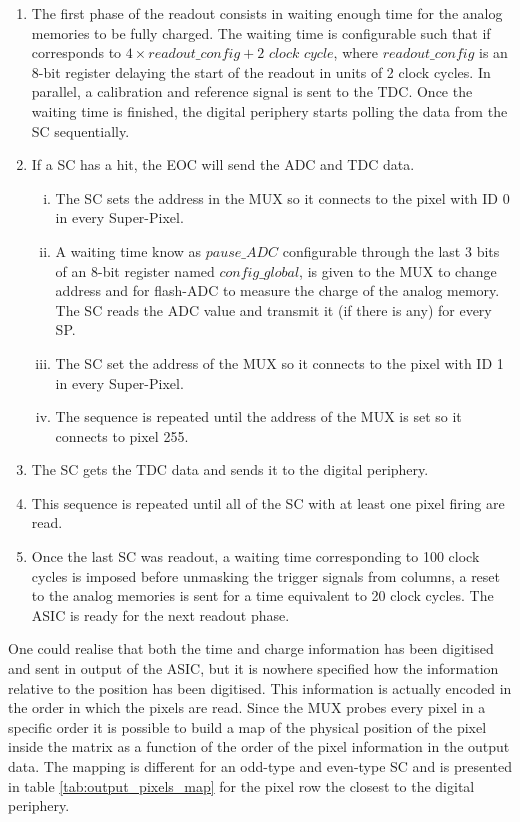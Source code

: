 \begin{enumerate} [1.]
				\item The first phase of the readout consists in waiting enough time for the analog memories to be fully charged. The waiting time is configurable such that if corresponds to $ 4 \times readout\_config + 2 \textit{ clock cycle}$, where $readout\_config$ is an 8-bit register delaying the start of the readout in units of 2 clock cycles. In parallel, a calibration and reference signal is sent to the TDC. Once the waiting time is finished, the digital periphery starts polling the data from the SC sequentially. 
				\item If a SC has a hit, the EOC will send the ADC and TDC data.
				\begin{enumerate}[(i)]
					\item The SC sets the address in the MUX so it connects to the pixel with ID 0 in every Super-Pixel. 
					\item A waiting time know as $pause\_ADC$ configurable through the last 3 bits of an 8-bit register named $config\_global$, is given to the MUX to change address and for flash-ADC to measure the charge of the analog memory. The SC reads the ADC value and transmit it (if there is any) for every SP. 
					\item The SC set the address of the MUX so it connects to the pixel with ID 1 in every Super-Pixel.
					\item The sequence is repeated until the address of the MUX is set so it connects to pixel 255.    
				\end{enumerate}
			
				\item The SC gets the TDC data and sends it to the digital periphery. 
				\item This sequence is repeated until all of the SC with at least one pixel firing are read. 
				\item Once the last SC was readout, a waiting time corresponding to 100 clock cycles is imposed before unmasking the trigger signals from columns, a reset to the analog memories is sent for a time equivalent to 20 clock cycles. The ASIC is ready for the next readout phase. 
			\end{enumerate}
		
			One could realise that both the time and charge information has been digitised and sent in output of the ASIC, but it is nowhere specified how the information relative to the position has been digitised. This information is actually encoded in the order in which the pixels are read. Since the MUX probes every pixel in a specific order it is possible to build a map of the physical position of the pixel inside the matrix as a function of the order of the pixel information in the output data. The mapping is different for an odd-type and even-type SC and is presented in table \ref{tab:output_pixels_map} for the pixel row the closest to the digital periphery. 
		
